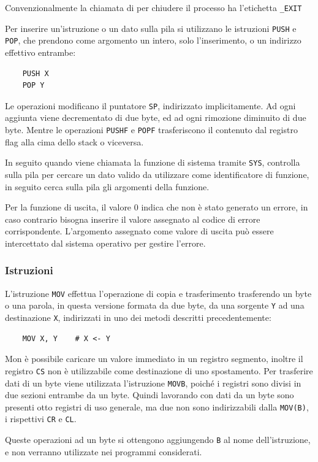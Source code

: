 \documentclass{article}
\numberwithin{equation}{subsection}
\begin{document}
Convenzionalmente la chiamata di per chiudere il processo ha l'etichetta \verb|_EXIT|

Per inserire un'istruzione o un dato sulla pila si utilizzano le istruzioni \verb|PUSH| e \verb|POP|, che prendono come argomento un intero, solo l'inserimento, o un indirizzo effettivo entrambe:
\begin{verbatim}
    PUSH X
    POP Y
\end{verbatim}
Le operazioni modificano il puntatore \verb|SP|, indirizzato implicitamente. Ad ogni aggiunta viene decrementato di due byte, ed ad ogni rimozione diminuito di due byte. 
Mentre le operazioni \verb|PUSHF| e \verb|POPF| trasferiscono il contenuto dal registro flag alla cima dello stack o viceversa. 


In seguito quando viene chiamata la funzione di sistema tramite \verb|SYS|, controlla sulla pila per cercare un dato valido da utilizzare come 
identificatore di funzione, in seguito cerca sulla pila gli argomenti della funzione. 

Per la funzione di uscita, il valore 0 indica che non è stato generato un errore, in caso contrario 
bisogna inserire il valore assegnato al codice di errore corrispondente. L'argomento assegnato come 
valore di uscita può essere intercettato dal sistema operativo per gestire l'errore. 

\subsubsection{Istruzioni}

L'istruzione \verb|MOV| effettua l'operazione di copia e trasferimento trasferendo un byte o una 
parola, in questa versione formata da due byte, da una sorgente \verb|Y| ad una destinazione \verb|X|, indirizzati in uno dei metodi descritti precedentemente:
\begin{verbatim}
    MOV X, Y    # X <- Y
\end{verbatim}
Mon è possibile caricare un valore immediato in 
un registro segmento, inoltre il registro \verb|CS| non è utilizzabile come destinazione di uno spostamento. 
Per trasferire dati di un byte viene utilizzata l'istruzione \verb|MOVB|, poiché i registri sono divisi in due sezioni 
entrambe da un byte. Quindi lavorando con dati da un byte sono presenti otto registri di uso generale, ma due 
non sono indirizzabili dalla \verb|MOV(B)|, i rispettivi \verb|CR| e \verb|CL|. 

Queste operazioni ad un byte si ottengono aggiungendo \verb|B| al nome dell'istruzione, e non verranno utilizzate nei programmi considerati. 
\end{document}
